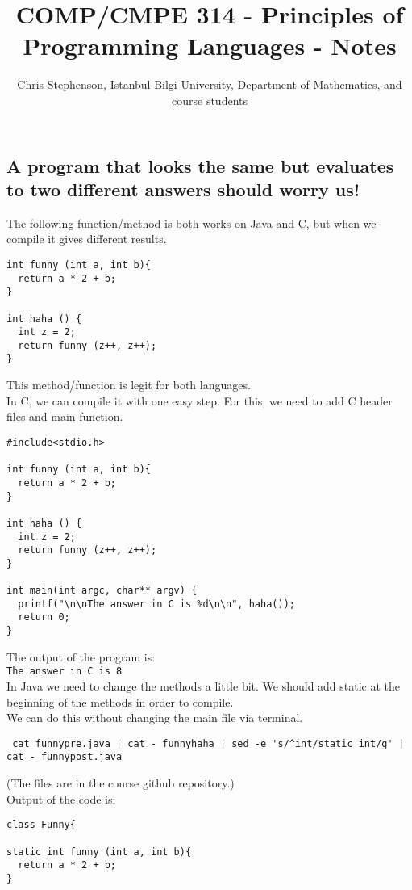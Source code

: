 \documentclass{article}
\begin{document}
\title{COMP/CMPE 314 - Principles of Programming Languages - Notes}
\author{Chris Stephenson, Istanbul Bilgi University, Department of Mathematics, and course students}
\maketitle
 
\begin{flushleft}
\section*{A program that looks the same but evaluates to two different answers should worry us!}
The following function/method is both works on Java and C, but when we compile it gives different results.
\begin{verbatim}
int funny (int a, int b){
  return a * 2 + b;
}

int haha () {
  int z = 2;
  return funny (z++, z++);
}
\end{verbatim}
This method/function is legit for both languages.\\
\bigskip
In C, we can compile it with one easy step. For this, we need to add C header files and main function.
\begin{verbatim}
#include<stdio.h>

int funny (int a, int b){
  return a * 2 + b;
}

int haha () {
  int z = 2;
  return funny (z++, z++);
}

int main(int argc, char** argv) {
  printf("\n\nThe answer in C is %d\n\n", haha());
  return 0;
}
\end{verbatim}
The output of the program is:\\
\verb|The answer in C is 8|\\
\bigskip
In Java we need to change the methods a little bit. We should add static at the beginning of the methods in order to compile.\\
We can do this without changing the main file via terminal.\\
\begin{verbatim}
 cat funnypre.java | cat - funnyhaha | sed -e 's/^int/static int/g' | cat - funnypost.java
\end{verbatim}
(The files are in the course github repository.)\\
\pagebreak
Output of the code is:
\begin{verbatim}
class Funny{

static int funny (int a, int b){
  return a * 2 + b;
}


\end{verbatim}
\end{flushleft}
\end{document}
